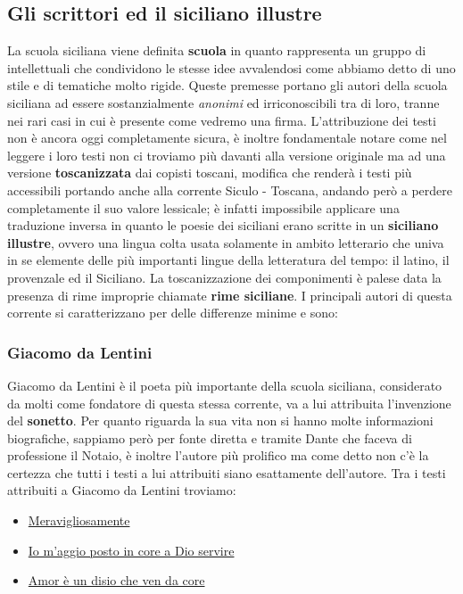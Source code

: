\documentclass[a4paper, 11pt]{article}
\begin{document}
\subsection{Gli scrittori ed il siciliano illustre}
La scuola siciliana viene definita \textbf{scuola} in quanto rappresenta un gruppo di intellettuali che condividono le stesse idee avvalendosi come abbiamo detto di uno stile e di tematiche molto rigide. Queste premesse portano gli autori della scuola siciliana ad essere sostanzialmente \textit{anonimi} ed irriconoscibili tra di loro, tranne nei rari casi in cui è presente come vedremo una firma. L'attribuzione dei testi non è ancora oggi completamente sicura, è inoltre fondamentale notare come nel leggere i loro testi non ci troviamo più davanti alla versione originale ma ad una versione \textbf{toscanizzata} dai copisti toscani, modifica che renderà i testi più accessibili portando anche alla corrente Siculo - Toscana, andando però a perdere completamente il suo valore lessicale; è infatti impossibile applicare una traduzione inversa in quanto le poesie dei siciliani erano scritte in un \textbf{siciliano illustre}, ovvero una lingua colta usata solamente in ambito letterario che univa in se elemente delle più importanti lingue della letteratura del tempo: il latino, il provenzale ed il Siciliano.
La toscanizzazione dei componimenti è palese data la presenza di rime improprie chiamate \textbf{rime siciliane}.
I principali autori di questa corrente si caratterizzano per delle differenze minime e sono:
\subsubsection{Giacomo da Lentini}
Giacomo da Lentini è il poeta più importante della scuola siciliana, considerato da molti come fondatore di questa stessa corrente, va a lui attribuita l'invenzione del \textbf{sonetto}.
Per quanto riguarda la sua vita non si hanno molte informazioni biografiche, sappiamo però per fonte diretta e tramite Dante che faceva di professione il Notaio, è inoltre l'autore più prolifico ma come detto non c'è la certezza che tutti i testi a lui attribuiti siano esattamente dell'autore.
Tra i testi attribuiti a Giacomo da Lentini troviamo:
\begin{itemize}
    \item \hyperlink{para:meravigliosamente}{Meravigliosamente}
    \item \hyperlink{para:postoincore}{Io m'aggio posto in core a Dio servire}
    \item \hyperlink{para:amorun}{Amor è un disio che ven da core}
\end{itemize}
\end{document}
